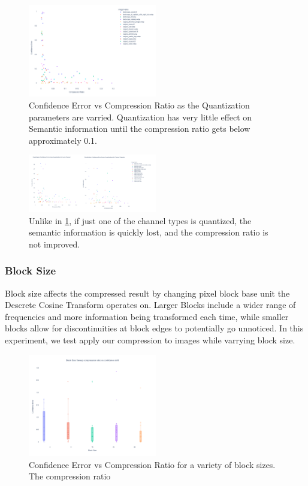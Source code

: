 \begin{figure}
    \label{fig:Confidence vs Quantization}
    \includegraphics[width=0.5\textwidth]{assets/Quantization Sweep No Title Chrominance and Luminance.png}
    \caption{Confidence Error vs Compression Ratio as the Quantization parameters are varried. Quantization has very little effect on Semantic information until the compression ratio gets below approximately 0.1.}
\end{figure}
\begin{figure}
    \label{fig:just chroma or luma downsampling}
    \includegraphics[width=0.5\textwidth]{assets/Chroma and Luma downsampling combined.png}
    \caption{Unlike in \ref{fig:Confidence vs Quantization}, if just one of the channel types is quantized, the semantic information is quickly lost, and the compression ratio is not improved.}
\end{figure}

\subsubsection{Block Size}

Block size affects the compressed result by changing pixel block base unit the Descrete Cosine Transform operates on.
Larger Blocks include a wider range of frequencies and more information being transformed each time, while smaller blocks allow for discontinuities at block edges to potentially go unnoticed.
In this experiment, we test apply our compression to images while varrying block size.

\begin{figure}
    \label{fig:block_size_sweep}
    \includegraphics[width=0.5\textwidth]{assets/Confidence Err Vs Block Size.png}
    \caption{Confidence Error vs Compression Ratio for a variety of block sizes. The compression ratio }
\end{figure}

